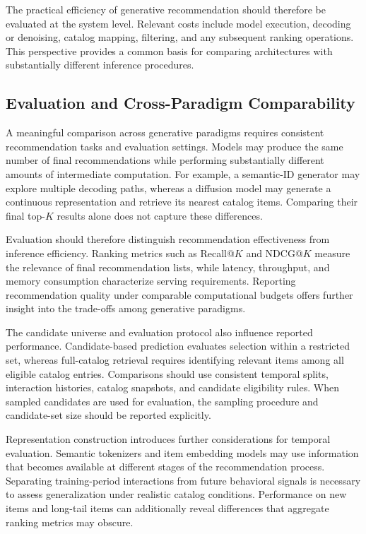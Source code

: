 \documentclass[sigconf,nonacm]{acmart}
\begin{document}
The practical efficiency of generative
recommendation should therefore be evaluated
at the system level. Relevant costs include
model execution, decoding or denoising,
catalog mapping, filtering, and any subsequent
ranking operations. This perspective provides
a common basis for comparing architectures
with substantially different inference procedures.

\subsection{Evaluation and Cross-Paradigm Comparability}

A meaningful comparison across generative
paradigms requires consistent recommendation
tasks and evaluation settings. Models may
produce the same number of final recommendations
while performing substantially different amounts
of intermediate computation. For example, a
semantic-ID generator may explore multiple
decoding paths, whereas a diffusion model may
generate a continuous representation and
retrieve its nearest catalog items. Comparing
their final top-$K$ results alone does not
capture these differences.

Evaluation should therefore distinguish
recommendation effectiveness from inference
efficiency. Ranking metrics such as Recall@$K$
and NDCG@$K$ measure the relevance of final
recommendation lists, while latency, throughput,
and memory consumption characterize serving
requirements. Reporting recommendation quality
under comparable computational budgets offers
further insight into the trade-offs among
generative paradigms.

The candidate universe and evaluation protocol
also influence reported performance. Candidate-based
prediction evaluates selection within a restricted
set, whereas full-catalog retrieval requires
identifying relevant items among all eligible
catalog entries. Comparisons should use consistent
temporal splits, interaction histories, catalog
snapshots, and candidate eligibility rules.
When sampled candidates are used for evaluation,
the sampling procedure and candidate-set size
should be reported explicitly.

Representation construction introduces further
considerations for temporal evaluation.
Semantic tokenizers and item embedding models
may use information that becomes available
at different stages of the recommendation
process. Separating training-period interactions
from future behavioral signals is necessary
to assess generalization under realistic
catalog conditions. Performance on new items
and long-tail items can additionally reveal
differences that aggregate ranking metrics
may obscure.
\end{document}
